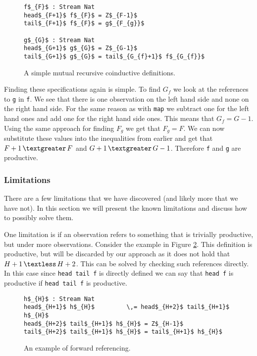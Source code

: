 \begin{figure}
\begin{Verbatim}[commandchars=\\\{\},codes={\catcode`$=3\catcode`_=8}]
f$_{F}$ : Stream Nat
head$_{F+1}$ f$_{F}$ = Z$_{F-1}$
tail$_{F+1}$ f$_{F}$ = g$_{F_{g}}$

g$_{G}$ : Stream Nat
head$_{G+1}$ g$_{G}$ = Z$_{G-1}$
tail$_{G+1}$ g$_{G}$ = tail$_{G_{f}+1}$ f$_{G_{f}}$
\end{Verbatim}
\caption{A simple mutual recursive coinductive definitions.}
\label{fig:mutRec1}
\end{figure}

Finding these specifications again is simple. To find $G_{f}$ we look at the references to \texttt{g} in \texttt{f}. We see that there is one observation on the left hand side and none on the right hand side. For the same reason as with \texttt{map} we subtract one for the left hand ones and add one for the right hand side ones. This means that $G_{f} = G - 1$. Using the same approach for finding $F_{g}$ we get that $F_{g} = F$. We can now substitute these values into the inequalities from earlier and get that $F+1\,\textgreater\,F$ and $G+1\,\textgreater\,G - 1$. Therefore \texttt{f} and \texttt{g} are productive.

\subsubsection{Limitations}
There are a few limitations that we have discovered (and likely more that we have not). In this section we will present the known limitations and discuss how to possibly solve them.

One limitation is if an observation refers to something that is trivially productive, but under more observations. Consider the example in Figure \ref{fig:forwardRef}. This definition is productive, but will be discarded by our approach as it does not hold that $H+1\,\textless\,H+2$. This can be solved by checking such references directly. In this case since \texttt{head tail f} is directly defined we can say that \texttt{head f} is productive if \texttt{head tail f} is productive.

\begin{figure}
\begin{Verbatim}[commandchars=\\\{\},codes={\catcode`$=3\catcode`_=8}]
h$_{H}$ : Stream Nat
head$_{H+1}$ h$_{H}$         \,= head$_{H+2}$ tail$_{H+1}$ h$_{H}$
head$_{H+2}$ tail$_{H+1}$ h$_{H}$ = Z$_{H-1}$
tail$_{H+2}$ tail$_{H+1}$ h$_{H}$ = tail$_{H+1}$ h$_{H}$
\end{Verbatim}
\caption{An example of forward referencing.}
\label{fig:forwardRef}
\end{figure}

